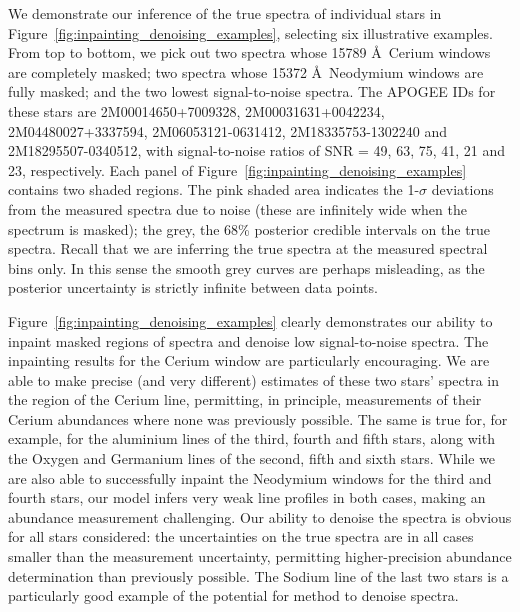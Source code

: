 \documentclass[a4paper,fleqn,usenatbib]{mnras}
\begin{document}
We demonstrate our inference of the true spectra of individual stars in Figure~\ref{fig:inpainting_denoising_examples}, selecting six illustrative examples. From top to bottom, we pick out two spectra whose 15789 \AA\ Cerium windows are completely masked; two spectra whose 15372 \AA\ Neodymium windows are fully masked; and the two lowest signal-to-noise spectra. The APOGEE IDs for these stars are 2M00014650+7009328, 2M00031631+0042234, 2M04480027+3337594, 2M06053121-0631412, 2M18335753-1302240 and 2M18295507-0340512, with signal-to-noise ratios of SNR = 49, 63, 75, 41, 21 and 23, respectively. Each panel of Figure~\ref{fig:inpainting_denoising_examples} contains two shaded regions. The pink shaded area indicates the 1-$\sigma$ deviations from the measured spectra due to noise (these are infinitely wide when the spectrum is masked); the grey, the 68\% posterior credible intervals on the true spectra. Recall that we are inferring the true spectra at the measured spectral bins only. In this sense the smooth grey curves are perhaps misleading, as the posterior uncertainty is strictly infinite between data points.

Figure~\ref{fig:inpainting_denoising_examples} clearly demonstrates our ability to inpaint masked regions of spectra and denoise low signal-to-noise spectra. The inpainting results for the Cerium window are particularly encouraging. We are able to make precise (and very different) estimates of these two stars' spectra in the region of the Cerium line, permitting, in principle, measurements of their Cerium abundances where none was previously possible. The same is true for, for example, for the aluminium lines of the third, fourth and fifth stars, along with the Oxygen and Germanium lines of the second, fifth and sixth stars. While we are also able to successfully inpaint the Neodymium windows for the third and fourth stars, our model infers very weak line profiles in both cases, making an abundance measurement challenging. Our ability to denoise the spectra is obvious for all stars considered: the uncertainties on the true spectra are in all cases smaller than the measurement uncertainty, permitting higher-precision abundance determination than previously possible. The Sodium line of the last two stars is a particularly good example of the potential for method to denoise spectra.
\end{document}
